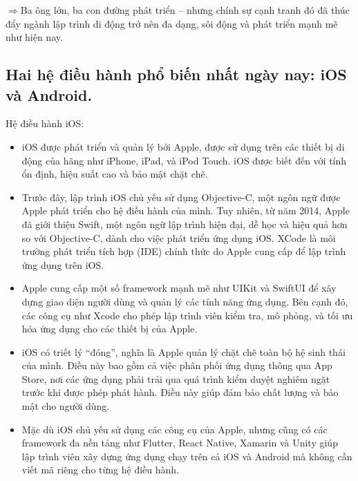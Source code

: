     \begin{flushleft}
      \hspace*{0.8cm}$\Rightarrow$Ba ông lớn, ba con đường phát triển – nhưng chính sự cạnh tranh đó đã thúc đẩy ngành lập trình di động trở nên đa dạng, sôi động và phát triển mạnh mẽ như hiện nay.
    \end{flushleft}

\subsection{Hai hệ điều hành phổ biến nhất ngày nay: iOS và Android.}
\renewcommand{\labelitemi}{--}    
    \begin{flushleft}
        \hspace*{0.8cm}Hệ điều hành iOS:
        \setlength{\leftmargini}{1.5cm}
        \begin{itemize}
            \item iOS được phát triển và quản lý bởi Apple, được sử dụng trên các thiết bị di động của hãng như iPhone, iPad, và iPod Touch. iOS được biết đến với tính ổn định, hiệu suất cao và bảo mật chặt chẽ.
            \item Trước đây, lập trình iOS chủ yếu sử dụng Objective-C, một ngôn ngữ được Apple phát triển cho hệ điều hành của mình. Tuy nhiên, từ năm 2014, Apple đã giới thiệu Swift, một ngôn ngữ lập trình hiện đại, dễ học và hiệu quả hơn so với Objective-C, dành cho việc phát triển ứng dụng iOS. XCode là môi trường phát triển tích hợp (IDE) chính thức do Apple cung cấp để lập trình ứng dụng trên iOS.
            \item Apple cung cấp một số framework mạnh mẽ như UIKit và SwiftUI để xây dựng giao diện người dùng và quản lý các tính năng ứng dụng. Bên cạnh đó, các công cụ như Xcode cho phép lập trình viên kiểm tra, mô phỏng, và tối ưu hóa ứng dụng cho các thiết bị của Apple.
            \item iOS có triết lý “đóng”, nghĩa là Apple quản lý chặt chẽ toàn bộ hệ sinh thái của mình. Điều này bao gồm cả việc phân phối ứng dụng thông qua App Store, nơi các ứng dụng phải trải qua quá trình kiểm duyệt nghiêm ngặt trước khi được phép phát hành. Điều này giúp đảm bảo chất lượng và bảo mật cho người dùng.
            \item Mặc dù iOS chủ yếu sử dụng các công cụ của Apple, nhưng cũng có các framework đa nền tảng như Flutter, React Native, Xamarin và Unity giúp lập trình viên xây dựng ứng dụng chạy trên cả iOS và Android mà không cần viết mã riêng cho từng hệ điều hành.
        \end{itemize}
    \end{flushleft}

